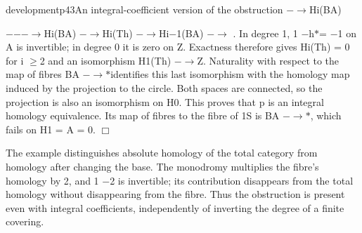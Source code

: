 \begin{dcomment}{development}{p43}{An integral-coefficient version of the obstruction}
\textperiodcentered{} \textperiodcentered{} \textperiodcentered{} \ensuremath{-}\ensuremath{\to}Hi(BA)

\ensuremath{-}\ensuremath{-}\ensuremath{-}\ensuremath{\to}Hi(BA) \ensuremath{-}\ensuremath{\to}Hi(Th) \ensuremath{-}\ensuremath{\to}Hi\ensuremath{-}1(BA) \ensuremath{-}\ensuremath{\to}\textperiodcentered{} \textperiodcentered{} \textperiodcentered{} . In degree 1, 1 \ensuremath{-}h\ensuremath{*}= \ensuremath{-}1 on A is invertible; in degree 0 it is zero on Z. Exactness therefore gives Hi(Th) = 0 for i \ensuremath{\geq}2 and an isomorphism H1(Th) \ensuremath{-}\ensuremath{\to}Z. Naturality with respect to the map of fibres BA \ensuremath{-}\ensuremath{\to}\ensuremath{*}identifies this last isomorphism with the homology map induced by the projection to the circle. Both spaces are connected, so the projection is also an isomorphism on H0. This proves that p is an integral homology equivalence. Its map of fibres to the fibre of 1S is BA \ensuremath{-}\ensuremath{\to}\ensuremath{*}, which fails on H1 = A = 0. \ensuremath{\Box}

The example distinguishes absolute homology of the total category from homology after changing the base. The monodromy multiplies the fibre’s homology by 2, and 1 \ensuremath{-}2 is invertible; its contribution disappears from the total homology without disappearing from the fibre. Thus the obstruction is present even with integral coefficients, independently of inverting the degree of a finite covering.

\end{dcomment}

